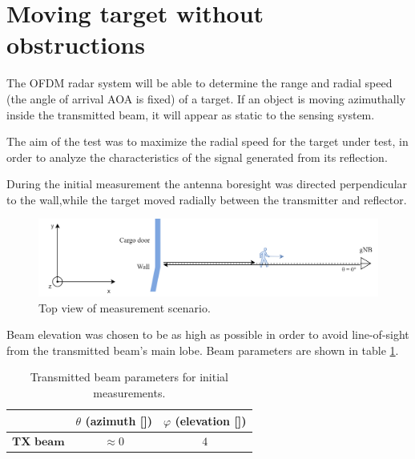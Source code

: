 \section{Moving target without obstructions}

The OFDM radar system will be able to determine the range and radial speed (the angle of arrival AOA is fixed) of a target. If an object is moving azimuthally inside the transmitted beam, it will appear as static to the sensing system.

The aim of the test was to maximize the radial speed for the target under test, in order to analyze the characteristics of the signal generated from its reflection.

During the initial measurement the antenna boresight was directed perpendicular to the wall,while the target moved radially between the transmitter and reflector.

\begin{figure}[H]
	\centering
	\includegraphics[width=1\textwidth]{Images/Test1/base-top_view}
	\caption{Top view of measurement scenario.}
	\label{fig:Test1_base-top_view}
\end{figure}


Beam elevation was chosen to be as high as possible in order to avoid line-of-sight from the transmitted beam's main lobe. Beam parameters are shown in table \ref{table:Test1TXBeamParams}.


\begin{table}[H]
	\centering 
	\begin{tabular}{|p{9em} c c |}
		\hline
		\rowcolor{bluepoli!40} %
		\textbf{} & \textbf{$\theta$ (azimuth [\textdegree])} & \textbf{$\varphi$ (elevation [\textdegree])} \T\B \\
		\hline \hline
		$\textbf{TX beam}$ & $\approx 0$ & $4$ \T\B \\
		
		\hline
	\end{tabular}
	\\[10pt]
	\caption{Transmitted beam parameters for initial measurements.}
	\label{table:Test1TXBeamParams}
\end{table}


